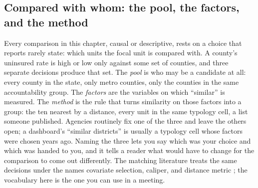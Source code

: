 \subsection{Compared with whom: the pool, the factors, and the method}\label{ch08-sec:peers}
Every comparison in this chapter, causal or descriptive, rests on a choice that reports rarely state: which units the focal unit is compared with. A county's uninsured rate is high or low only against some set of counties, and three separate decisions produce that set. The \emph{pool} is who may be a candidate at all: every county in the state, only metro counties, only the counties in the same accountability group. The \emph{factors} are the variables on which \enquote{similar} is measured. The \emph{method} is the rule that turns similarity on those factors into a group: the ten nearest by a distance, every unit in the same typology cell, a list someone published. Agencies routinely fix one of the three and leave the others open; a dashboard's \enquote{similar districts} is usually a typology cell whose factors were chosen years ago. Naming the three lets you say which was your choice and which was handed to you, and it tells a reader what would have to change for the comparison to come out differently. The matching literature treats the same decisions under the names covariate selection, caliper, and distance metric \parencite{stuart2010matching}; the vocabulary here is the one you can use in a meeting.

